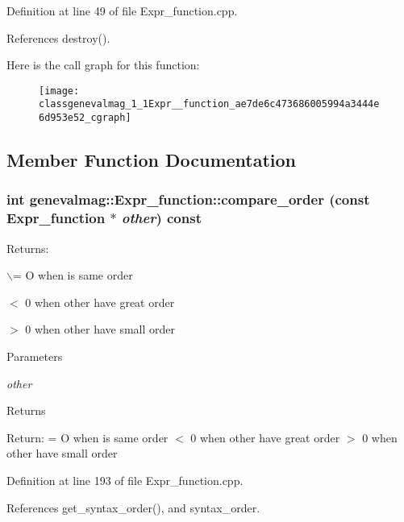 Definition at line 49 of file Expr\_\-function.cpp.



References destroy().



Here is the call graph for this function:\nopagebreak
\begin{figure}[H]
\begin{center}
\leavevmode
\texttt{[image: classgenevalmag\_1\_1Expr\_\_function\_ae7de6c473686005994a3444e6d953e52\_cgraph]}
\end{center}
\end{figure}




\subsection{Member Function Documentation}
\hypertarget{classgenevalmag_1_1Expr__function_a4608528d2e116c0794eb78f2724b6a18}{
\subsubsection[{compare\_\-order}]{\setlength{\rightskip}{0pt plus 5cm}int genevalmag::Expr\_\-function::compare\_\-order (const {\bf Expr\_\-function} $\ast$ {\em other}) const}}
\label{classgenevalmag_1_1Expr__function_a4608528d2e116c0794eb78f2724b6a18}
Returns:\par
 $\backslash$= O when is same order\par
 $<$ 0 when other have great order\par
 $>$ 0 when other have small order\par
 
\begin{DoxyParams}{Parameters}
\item[{\em other}]\end{DoxyParams}
\begin{DoxyReturn}{Returns}

\end{DoxyReturn}
Return: = O when is same order $<$ 0 when other have great order $>$ 0 when other have small order 

Definition at line 193 of file Expr\_\-function.cpp.



References get\_\-syntax\_\-order(), and syntax\_\-order.



